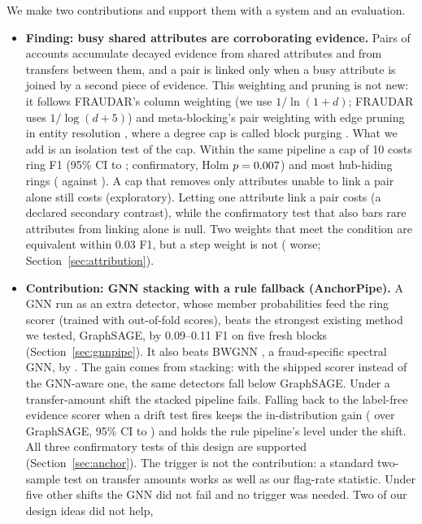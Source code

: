 We make two contributions and support them with a system and an evaluation.
\begin{itemize}
\item \textbf{Finding: busy shared attributes are corroborating evidence.}
Pairs of accounts accumulate decayed evidence from shared attributes and from
transfers between them, and a pair is linked only when a busy attribute is
joined by a second piece of evidence. This weighting and pruning is not new: it
follows FRAUDAR's column weighting \cite{hooi2016fraudar} (we use $1/\ln(1+d)$;
FRAUDAR uses $1/\log(d+5)$) and meta-blocking's pair weighting with edge pruning
in entity resolution \cite{papadakis2014metablocking}, where a degree cap is
called block purging \cite{papadakis2013blocking}. What we add is an isolation
test of the cap. Within the same pipeline a cap of 10 costs \RfCapD{} ring F1 (95\%
CI \RfCapLo{} to \RfCapHi{}; confirmatory, Holm $p=0.007$) and most hub-hiding
rings (\RfCapHHCap{} against \RfCapHHNo{}). A cap that removes only attributes unable
to link a pair alone still costs \RtCapTwentySevenA{} (exploratory). Letting one
attribute link a pair costs \RfNdOneD{} (a declared secondary contrast), while the
confirmatory test that also bars rare attributes from linking alone is null. Two
weights that meet the condition are equivalent within 0.03 F1, but a step weight
is not (\RtStepA{} worse; Section~\ref{sec:attribution}).
\item \textbf{Contribution: GNN stacking with a rule fallback (AnchorPipe).} A
GNN run as an extra detector, whose member probabilities feed the ring scorer
(trained with out-of-fold scores), beats the strongest existing method we
tested, GraphSAGE, by 0.09--0.11 F1 on five fresh blocks (Section~\ref{sec:gnnpipe}). It
also beats BWGNN \cite{tang2022bwgnn}, a fraud-specific spectral GNN, by
\BwAnchorBwD{}. The gain comes from stacking: with the shipped scorer instead of
the GNN-aware one, the same detectors fall below GraphSAGE. Under a
transfer-amount shift the stacked pipeline fails. Falling back to the label-free
evidence scorer when a drift test fires keeps the in-distribution gain
(\AnTOneVsgnnunscoredD{} over GraphSAGE, 95\% CI \AnTOneVsgnnunscoredLo{} to
\AnTOneVsgnnunscoredHi{}) and holds the rule pipeline's level under the shift. All
three confirmatory tests of this design are supported (Section~\ref{sec:anchor}).
The trigger is not the contribution: a standard two-sample test on transfer
amounts works as well as our flag-rate statistic. Under five other shifts the
GNN did not fail and no trigger was needed. Two of our design ideas did not help,

\end{itemize}
